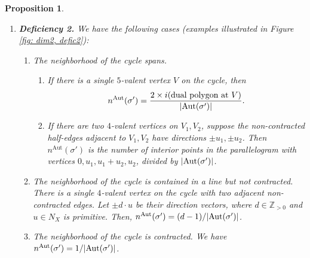 \documentclass{article}
\def\Z{\mathbb{Z}}
\def\Aut{{\rm Aut}}
\newtheorem{proposition}[definition]{Proposition}
\newcommand{\nn}{n^{\operatorname{Aut}}}
\begin{document}
\begin{proposition}
\begin{enumerate}
\begin{enumerate}
\begin{figure}[h]
                  \caption{Dimension 2, deficiency 1.}
                \label{fig: dim2, defic1}
            \end{figure}

            \end{enumerate}
        \item \textbf{Deficiency 2.} We have the following cases (examples illustrated in Figure \ref{fig: dim2, defic2}):
        \begin{enumerate}
            \item The neighborhood of the cycle spans. \begin{enumerate}[label=(\roman*)]
                \item If there is a single $5$-valent vertex $V$ on the cycle, then
                $$\nn(\sigma') = \frac{2 \times i(\text{dual polygon at $V$})}{|\Aut(\sigma')|}.$$ 
                \item If there are two $4$-valent vertices on $V_1, V_2$, suppose the non-contracted half-edges adjacent to $V_1, V_2$ have directions $\pm u_1, \pm u_2$. Then $\nn(\sigma')$ is the number of interior points in the parallelogram with vertices $0, u_1, u_1+u_2, u_2$, divided by $|\Aut(\sigma')|$. 
            \end{enumerate}
            \item The neighborhood of the cycle is contained in a line but not contracted. There is a single $4$-valent vertex on the cycle with two adjacent non-contracted edges. Let $\pm d \cdot u$ be their direction vectors, where $ d \in \Z_{>0}$ and $u \in N_X$ is primitive. 
            Then,  $\nn(\sigma') = (d-1)/|\Aut(\sigma')|$.
            \item The neighborhood of the cycle is contracted. We have $\nn(\sigma') = 1/|\Aut(\sigma')|$.
        \end{enumerate}
        \begin{figure}[H]
            \centering
            \begin{subfigure}[t]{0.35\textwidth}
                    \centering
\end{subfigure}
\end{figure}
\end{enumerate}
\end{proposition}
\end{document}
